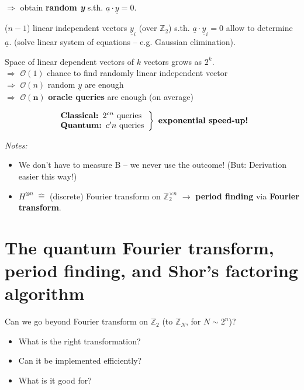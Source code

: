\documentclass[a4paper, 12pt]{article}
\theoremstyle{plain}
\theoremstyle{definition}
\theoremstyle{remark}
\begin{document}
\begin{enumerate}[label=(\roman*)]
      $\Longrightarrow$ obtain \textbf{random \emph{\underline{y}}} s.th. $\underline{a} \cdot \underline{y}=0$.

      ($n-1$) linear independent vectors $\underline{y}_i$ (over $\mathbb{Z}_2$) s.th. $\underline{a}\cdot \underline{y}_i=0$ allow to determine $\underline{a}$. (solve linear system of equations -- e.g. Gaussian elimination).

      Space of linear dependent vectors of $k$ vectors grows as $2^k$.\\
      $\Longrightarrow$ $\mathcal{O}(1)$ chance to find randomly linear independent vector\\
      $\Longrightarrow$ $\mathcal{O}(n)$ random $\underline{y}$ are enough\\
      $\Longrightarrow$ $\bm{\mathcal{O}(n)}$ \textbf{oracle queries} are enough (on average)
  \end{enumerate}

  \begin{equation*}
    \left.
    \begin{array}{ll}
      \text{\textbf{Classical: }} 2^{cn} \text{ queries}\\
      \text{\textbf{Quantum: }} c'n \text{ queries}
  \end{array}\right\}\text{ \textbf{exponential speed-up!}}
\end{equation*}

\emph{Notes:}
\begin{itemize}
  \item We don't have to measure B -- we never use the outcome! (But: Derivation easier this way!)
  \item $H^{\otimes n}\;\hat{=}$ (discrete) Fourier transform on $\mathbb{Z}_2^{\times n}$ $\longrightarrow$ \textbf{period finding} via \textbf{Fourier transform}.
\end{itemize}

\section{The quantum Fourier transform, period finding, and Shor's factoring algorithm}

Can we go beyond Fourier transform on $\mathbb{Z}_2$ (to $\mathbb{Z}_N$, for $N\sim 2^n$)?
\begin{itemize}
  \item What is the right transformation?
  \item Can it be implemented efficiently?
  \item What is it good for?
\end{itemize}
\end{document}
